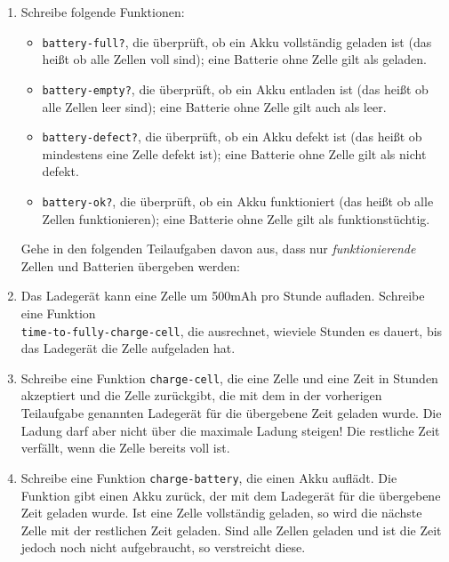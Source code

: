 \begin{aufgabe}
\begin{enumerate}
  \item Schreibe folgende Funktionen:

    \begin{itemize}
    \item \lstinline{battery-full?}, die überprüft, ob ein Akku
      vollständig geladen ist (das heißt ob alle Zellen voll sind); eine
      Batterie ohne Zelle gilt als geladen.

    \item \lstinline{battery-empty?}, die überprüft, ob ein Akku entladen
      ist (das heißt ob alle Zellen leer sind); eine Batterie ohne Zelle
      gilt auch als leer.

    \item \lstinline{battery-defect?}, die überprüft, ob ein Akku defekt
      ist (das heißt ob mindestens eine Zelle defekt ist); eine Batterie
      ohne Zelle gilt als nicht defekt.

    \item \lstinline{battery-ok?}, die überprüft, ob ein Akku
      funktioniert (das heißt ob alle Zellen funktionieren); eine Batterie
      ohne Zelle gilt als funktionstüchtig.
      
    \end{itemize}

    Gehe in den folgenden Teilaufgaben davon aus, dass
      nur \emph{funktionierende} Zellen und Batterien übergeben
      werden:

  \item Das Ladegerät kann eine Zelle um 500mAh pro Stunde
    aufladen.  Schreibe eine Funktion \\
    \lstinline{time-to-fully-charge-cell}, die ausrechnet, wieviele
    Stunden es dauert, bis das Ladegerät die Zelle aufgeladen hat.

  \item Schreibe eine Funktion \lstinline{charge-cell}, die eine
    Zelle und eine Zeit in Stunden akzeptiert und die Zelle
    zurückgibt, die mit dem in der vorherigen Teilaufgabe genannten
    Ladegerät für die übergebene Zeit geladen wurde.  Die Ladung darf
    aber nicht über die maximale Ladung steigen!  Die restliche Zeit
    verfällt, wenn die Zelle bereits voll ist.

  \item Schreibe eine Funktion \lstinline{charge-battery}, die einen
    Akku auflädt.  Die Funktion gibt einen Akku zurück, der mit dem
    Ladegerät für die übergebene Zeit geladen wurde.  Ist eine Zelle
    vollständig geladen, so wird die nächste Zelle mit der restlichen
    Zeit geladen.  Sind alle Zellen geladen und ist die Zeit jedoch
    noch nicht aufgebraucht, so verstreicht diese.


\end{enumerate}
\end{aufgabe}
